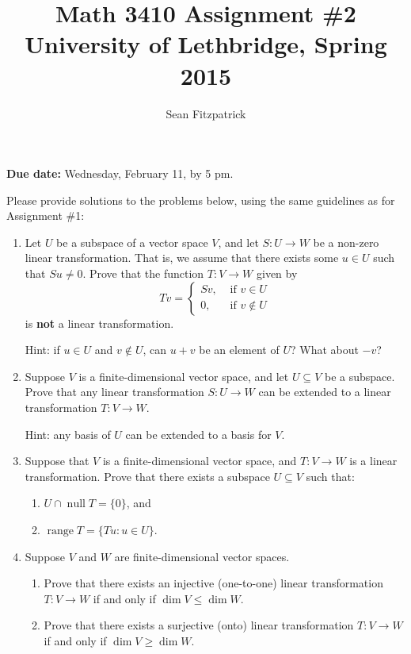 \documentclass[letterpaper,12pt]{article}
\title{Math 3410 Assignment \#2\\University of Lethbridge, Spring 2015}
\author{Sean Fitzpatrick}
\DeclareMathOperator{\nul}{null}
\DeclareMathOperator{\range}{range}
\begin{document}
 \maketitle

{\bf Due date:} Wednesday, February 11, by 5 pm.

\bigskip

Please provide solutions to the problems below, using the same guidelines as for Assignment \#1:


\begin{enumerate}
 \item Let $U$ be a subspace of a vector space $V$, and let $S:U\to W$ be a non-zero linear transformation. That is, we assume that there exists some $u\in U$ such that $Su\neq 0$. Prove that the function $T:V\to W$ given by
\[
 Tv = \begin{cases}Sv, &\text{ if } v\in U\\ 0, &\text{ if } v\notin U\end{cases}
\]
is {\bf not} a linear transformation.

Hint: if $u\in U$ and $v\notin U$, can $u+v$ be an element of $U$? What about $-v$?

 \item Suppose $V$ is a finite-dimensional vector space, and let $U\subseteq V$ be a subspace. Prove that any linear transformation $S:U\to W$ can be extended to a linear transformation $T:V\to W$.

Hint: any basis of $U$ can be extended to a basis for $V$. 

 \item Suppose that $V$ is a finite-dimensional vector space, and $T:V\to W$ is a linear transformation. Prove that there exists a subspace $U\subseteq V$ such that:
\begin{enumerate}
 \item $U\cap \nul T = \{0\}$, and
 \item $\range T = \{Tu : u\in U\}$.
\end{enumerate}
\item Suppose $V$ and $W$ are finite-dimensional vector spaces. 
\begin{enumerate}
\item Prove that there exists an injective (one-to-one) linear transformation $T:V\to W$ if and only if $\dim V\leq \dim W$.
\item Prove that there exists a surjective (onto) linear transformation $T:V\to W$ if and only if $\dim V\geq \dim W$.
\end{enumerate}

 \end{enumerate}
\end{document}
